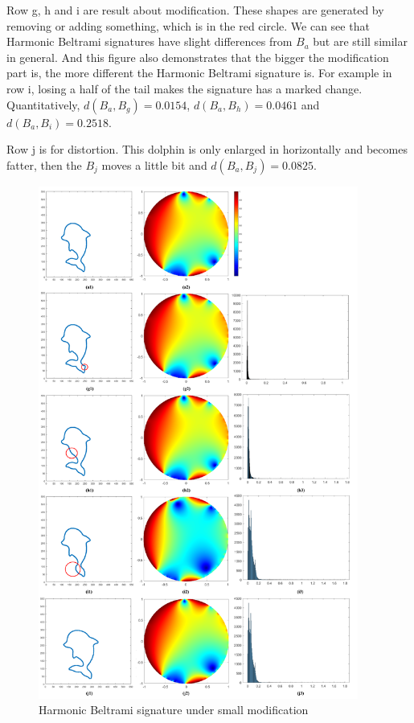 \documentclass[review,onefignum,onetabnum]{siamonline190516}
\begin{document}
        Row g, h and i are result about modification. These shapes are generated by removing or adding something, which is in the red circle. We can see that Harmonic Beltrami signatures have slight differences from $B_a$ but are still similar in general. And this figure also demonstrates that the bigger the modification part is, the more different the Harmonic Beltrami signature is. For example in row i, losing a half of the tail makes the signature has a marked change. Quantitatively, $d(B_a, B_g) = 0.0154$, $d(B_a, B_h) = 0.0461$ and $d(B_a, B_i) = 0.2518$.

        Row j is for distortion. This dolphin is only enlarged in horizontally and becomes fatter, then the $B_j$ moves a little bit and $d(B_a, B_j) = 0.0825$.

        \begin{figure}
            \begin{center}
                \includegraphics[width=10.5cm]{robust.png}
            \end{center}
            \caption{Harmonic Beltrami signature under small modification}
            \label{robust}
        \end{figure}
\end{document}
